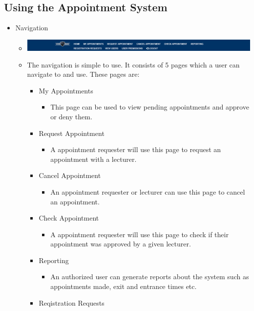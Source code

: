 \subsection{Using the Appointment System}
	\begin{itemize}
		\item Navigation
			\begin{itemize}
				\item \includegraphics[width=\linewidth]{images/Screenshots/Navigation.png}
				\item The navigation is simple to use. It consists of 5 pages which a user can navigate to and use. These pages are:
				\begin{itemize}
					\item My Appointments
						\begin{itemize}
							\item This page can be used to view pending appointments and approve or deny them.
						\end{itemize}
					\item Request Appointment
						\begin{itemize}
							\item A appointment requester will use this page to request an appointment with a lecturer.
						\end{itemize}
					\item Cancel Appointment
						\begin{itemize}
							\item An appointment requester or lecturer can use this page to cancel an appointment.
						\end{itemize}
					\item Check Appointment
						\begin{itemize}
							\item A appointment requester will use this page to check if their appointment was approved by a given lecturer.
						\end{itemize}
					\item Reporting
						\begin{itemize}
							\item An authorized user can generate reports about the system such as appointments made, exit and entrance times etc. 
						\end{itemize}
					\item Reqistration Requests

\end{itemize}
\end{itemize}
\end{itemize}
